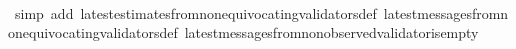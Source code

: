 \begin{isabellebody}
%
\isadelimproof
\ \ %
\endisadelimproof
%
\isatagproof
{}\isamarkupfalse%
\ {\isacharparenleft}simp\ add{\isacharcolon}\ latest{\isacharunderscore}estimates{\isacharunderscore}from{\isacharunderscore}non{\isacharunderscore}equivocating{\isacharunderscore}validators{\isacharunderscore}def\ latest{\isacharunderscore}messages{\isacharunderscore}from{\isacharunderscore}non{\isacharunderscore}equivocating{\isacharunderscore}validators{\isacharunderscore}def\ latest{\isacharunderscore}messages{\isacharunderscore}from{\isacharunderscore}non{\isacharunderscore}observed{\isacharunderscore}validator{\isacharunderscore}is{\isacharunderscore}empty{\isacharparenright}%
\endisatagproof
{\isafoldproof}%
%
\isadelimproof
\isanewline
%
\endisadelimproof
\isanewline
\isanewline
\isanewline
%
\isadelimtheory
\isanewline
%
\endisadelimtheory
%
\isatagtheory
{}\isamarkupfalse%
%
\endisatagtheory
{\isafoldtheory}%
%
\isadelimtheory
%
\endisadelimtheory
%
\end{isabellebody}%
\endinput
